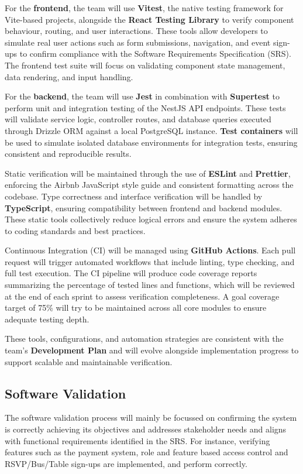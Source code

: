 \documentclass[12pt, titlepage]{article}
\begin{document}
For the \textbf{frontend}, the team will use \textbf{Vitest}, the native testing framework for Vite-based projects, alongside the \textbf{React Testing Library} to verify component behaviour, routing, and user interactions. These tools allow developers to simulate real user actions such as form submissions, navigation, and event sign-ups to confirm compliance with the Software Requirements Specification (SRS). The frontend test suite will focus on validating component state management, data rendering, and input handling.

For the \textbf{backend}, the team will use \textbf{Jest} in combination with \textbf{Supertest} to perform unit and integration testing of the NestJS API endpoints. These tests will validate service logic, controller routes, and database queries executed through Drizzle ORM against a local PostgreSQL instance. \textbf{Test containers} will be used to simulate isolated database environments for integration tests, ensuring consistent and reproducible results.

Static verification will be maintained through the use of \textbf{ESLint} and \textbf{Prettier}, enforcing the Airbnb JavaScript style guide and consistent formatting across the codebase. Type correctness and interface verification will be handled by \textbf{TypeScript}, ensuring compatibility between frontend and backend modules. These static tools collectively reduce logical errors and ensure the system adheres to coding standards and best practices.

Continuous Integration (CI) will be managed using \textbf{GitHub Actions}. Each pull request will trigger automated workflows that include linting, type checking, and full test execution. The CI pipeline will produce code coverage reports summarizing the percentage of tested lines and functions, which will be reviewed at the end of each sprint to assess verification completeness. A goal coverage target of 75\% will try to be maintained across all core modules to ensure adequate testing depth.

These tools, configurations, and automation strategies are consistent with the team’s \textbf{Development Plan} and will evolve alongside implementation progress to support scalable and maintainable verification.

\subsection{Software Validation}
The software validation process will mainly be focussed on confirming the system is correctly achieving its objectives and addresses stakeholder needs and aligns with functional requirements identified in the SRS. For instance, verifying features such as the payment system, role and feature based access control and RSVP/Bus/Table sign-ups are implemented, and perform correctly. 
\end{document}
